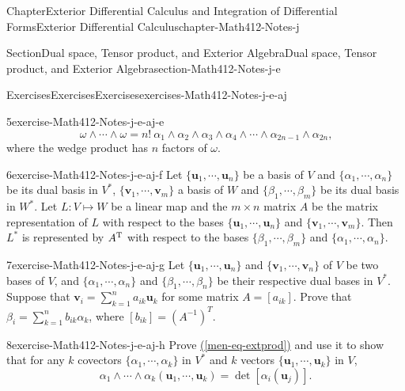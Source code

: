 \documentclass[oneside,10pt,]{book}
\newcommand{\xreffont}{\relax}
\numberwithin{equation}{section}
\newcommand{\bu}{\mathbf{u}}
\newcommand{\bv}{\mathbf{v}}
\begin{document}
\begin{chapterptx}{Chapter}{Exterior Differential Calculus and Integration of Differential Forms}{}{Exterior Differential Calculus}{}{}{chapter-Math412-Notes-j}
\begin{sectionptx}{Section}{Dual space, Tensor product, and Exterior Algebra}{}{Dual space, Tensor product, and Exterior Algebra}{}{}{section-Math412-Notes-j-e}
\begin{exercises-subsection-numberless}{Exercises}{Exercises}{}{Exercises}{}{}{exercises-Math412-Notes-j-e-aj}
\begin{divisionexercise}{5}{}{}{exercise-Math412-Notes-j-e-aj-e}
\begin{equation*}
\omega\wedge \cdots \wedge \omega = n! \ \alpha_{1} \wedge \alpha_{2}\wedge\alpha_{3} \wedge \alpha_{4}\wedge \cdots \wedge
\alpha_{2n-1} \wedge \alpha_{2n}\text{,}
\end{equation*}
where the wedge product has \(n\) factors of \(\omega\).%
\end{divisionexercise}%
\begin{divisionexercise}{6}{}{}{exercise-Math412-Notes-j-e-aj-f}%
Let \(\{\bu_{1},\cdots, \bu_{n}\}\) be a basis of \(V\) and \(\{\alpha_{1},\cdots, \alpha_{n}\}\) be its dual basis in \(V^{*}\), \(\{\bv_{1},\cdots, \bv_{m}\}\) a basis of \(W\) and \(\{\beta_{1}, \cdots, \beta_{m}\}\) be its dual basis in \(W^{*}\). Let \(L:V\mapsto W\) be a linear map and the \(m\times n\) matrix \(A\) be the matrix representation of \(L\) with respect to the bases \(\{\bu_{1},\cdots, \bu_{n}\}\) and \(\{\bv_{1},\cdots, \bv_{m}\}\). Then \(L^{*}\) is represented by \(A^{\rm T}\) with respect to the bases \(\{\beta_{1}, \cdots, \beta_{m}\}\) and \(\{\alpha_{1},\cdots, \alpha_{n}\}\).%
\end{divisionexercise}%
\begin{divisionexercise}{7}{}{}{exercise-Math412-Notes-j-e-aj-g}%
Let \(\{\bu_{1},\cdots, \bu_{n}\}\) and \(\{\bv_{1},\cdots, \bv_{n}\}\) of \(V\) be two bases of \(V\),  and \(\{\alpha_{1},\cdots, \alpha_{n}\}\) and \(\{\beta_{1}, \cdots, \beta_{n}\}\) be their respective dual bases in \(V^{*}\). Suppose that \(\bv_{i}=\sum_{k=1}^{n}a_{ik} \bu_{k}\) for some matrix \(A=[a_{ik}]\). Prove that \(\beta_{i}=\sum_{k=1}^{n}b_{ik} \alpha_{k}\), where \([b_{ik}]=(A^{-1})^{T}\).%
\end{divisionexercise}%
\begin{divisionexercise}{8}{}{}{exercise-Math412-Notes-j-e-aj-h}%
Prove \hyperref[men-eq-extprod]{({\xreffont\ref{men-eq-extprod}})} and use it to show that for any \(k\) covectors \(\{\alpha_{1},\cdots, \alpha_{k}\}\) in \(V^{*}\) and \(k\) vectors \(\{\bu_{1},\cdots, \bu_{k}\}\) in \(V\),%
\begin{equation*}
\alpha_{1}\wedge \cdots\wedge \alpha_{k}(\bu_{1},\cdots, \bu_{k})
=\det \left[ \alpha_{i}(\bu_{j})\right].
\end{equation*}
%
\end{divisionexercise}%
\end{exercises-subsection-numberless}
\end{sectionptx}
%
%
\typeout{************************************************}
\typeout{************************************************}

\end{chapterptx}
\end{document}
